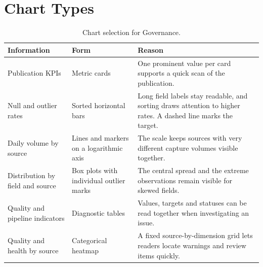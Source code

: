 \documentclass[a4paper,11pt,oneside]{book}
\begin{document}
\section{Chart Types}
\begin{table}[!htbp]
\centering
\small
\begin{tabularx}{\textwidth}{@{}L{3.2cm}L{3cm}Y@{}}
\toprule
Information & Form & Reason \\
\midrule
Publication KPIs & Metric cards & One prominent value per card supports a quick scan of the publication. \\
Null and outlier rates & Sorted horizontal bars & Long field labels stay readable, and sorting draws attention to higher rates. A dashed line marks the target. \\
Daily volume by source & Lines and markers on a logarithmic axis & The scale keeps sources with very different capture volumes visible together. \\
Distribution by field and source & Box plots with individual outlier marks & The central spread and the extreme observations remain visible for skewed fields. \\
Quality and pipeline indicators & Diagnostic tables & Values, targets and statuses can be read together when investigating an issue. \\
Quality and health by source & Categorical heatmap & A fixed source-by-dimension grid lets readers locate warnings and review items quickly. \\
\bottomrule
\end{tabularx}
\caption{Chart selection for Governance.}
\label{tab:chart-types}
\end{table}
\end{document}
